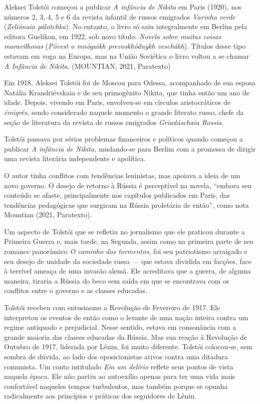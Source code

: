 \documentclass{article}
\begin{document}
Aleksei Tolstói começou a publicar \emph{A infância de Nikita} em Paris
(1920), nos números 2, 3, 4, 5 e 6 da revista infantil de russos
emigrados \emph{Varinha verde} (\emph{Zeliónaia pálotchka}). No entanto,
o livro só saiu integralmente em Berlim pela editora Guelikon, em 1922,
sob novo título: \emph{Novela sobre muitas coisas maravilhosas}
(\emph{Póvest o mnóguikh prevoskhódnykh veschákh}). Títulos desse tipo
estavam em voga na Europa, mas na União Soviética o livro voltou a se
chamar \emph{A Infância de Nikita}. (MOUNTIAN, 2021, Paratexto)

Em 1918, Aleksei Tolstói foi de Moscou para Odessa, acompanhado de sua
esposa Natália Krandriévskaia e de seu primogênito Nikita, que tinha
então um ano de idade. Depois, vivendo em Paris, envolveu-se em círculos
aristocráticos de \emph{émigrés,} sendo considerado naquele momento o
grande literato russo, chefe da seção de literatura da revista de russos
emigrados \emph{Griadúschaia Rossia}.

Tolstói passava por sérios problemas financeiros e políticos quando
começou a publicar \emph{A infância de Nikita,} mudando-se para Berlim
com a promessa de dirigir uma revista literária independente e
apolítica.

O autor tinha conflitos com tendências leninistas, mas apoiava a ideia
de um novo governo. O desejo de retorno à Rússia é perceptível na
novela, ``embora seu conteúdo se afaste, principalmente nos capítulos
publicados em Paris, das tendências pedagógicas que surgiram na Rússia
proletária de então'', como nota Mountian (2021, Paratexto).

Um aspecto de Tolstói que se refletiu no jornalismo que ele praticou
durante a Primeira Guerra e, mais tarde, na Segunda, assim como na
primeira parte de seu romance panorâmico \emph{O caminho dos tormentos,}
foi seu patriotismo arraigado e seu desejo de unidade da sociedade russa
--- que estava dividida em facções, face à terrível ameaça de uma
invasão alemã. Ele acreditava que a guerra, de alguma maneira, tiraria a
Rússia do beco sem saída em que se encontrava com os conflitos entre o
governo e as classes educadas.

Tolstói recebeu com entusiasmo a Revolução de Fevereiro de 1917. Ele
interpretou os eventos de então como o levante de uma nação inteira
contra um regime antiquado e prejudicial. Nesse sentido, estava em
consonância com a grande maioria das classes educadas da Rússia. Mas sua
reação à Revolução de Outubro de 1917, liderada por Lênin, foi muito
diferente. Tolstói colocou-se, sem sombra de dúvida, ao lado dos
oposicionistas ativos contra uma ditadura comunista. Um conto intitulado
\emph{Em um delírio} reflete seus pontos de vista naquela época. Ele não
partiu ao autoexílio apenas para ter uma vida mais confortável naqueles
tempos turbulentos, mas também porque se opunha radicalmente aos
princípios e práticas dos seguidores de Lênin.
\end{document}
